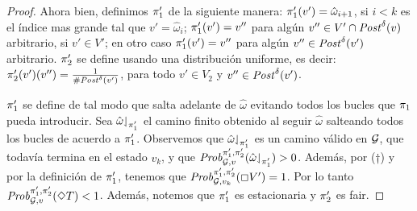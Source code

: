 \begin{proof}
  Ahora bien, definimos $\pi_{1}'$ de la siguiente manera:
  $\pi_{1}'(v') = \hat{\omega}_{i+1}$, si $i < k$ es el índice mas grande tal que $v' = \hat{\omega}_{i}$;
  $\pi_{1}'(v') = v''$ para algún $v'' \in
  V'\cap\mathit{Post}^\delta(v)$ arbitrario, si $v' \in V'$;
  en otro caso $\pi_{1}'(v') = v''$ para algún
  $v'' \in \mathit{Post}^\delta(v')$ arbitrario.
  $\pi_{2}'$ se define usando una distribución uniforme, es decir:
  $\pi_{2}'(v')(v'') = \frac{1}{\# \mathit{Post}^\delta(v')}$, para todo $v'
  \in V_2$ y $v'' \in \mathit{Post}^\delta(v')$.
  
  $\pi_{1}'$ se define de tal modo que salta adelante de $\hat{\omega}$
  evitando todos los bucles que $\pi_{1}$ pueda introducir.  Sea
  $\hat{\omega}{\downharpoonleft}_{\pi_{1}'}$ el camino finito obtenido al seguir $\hat{\omega}$ salteando todos los bucles de acuerdo a $\pi_{1}'$.
  Observemos que $\hat{\omega}{\downharpoonleft}_{\pi_{1}'}$ es un camino válido en $\mathcal{G}$, que todavía termina en el estado $v_k$, y que
  $\mathit{Prob}^{\pi_{1}',\pi_{2}'}_{\mathcal{G},v}({\hat{\omega}{\downharpoonleft}_{\pi_{1}'}})>0$.
  Además, por ($\dag$) y por la definición de $\pi_{1}'$, tenemos que $\mathit{Prob}^{\pi_{1}',\pi_{2}'}_{\mathcal{G}, v_k}(\Box V') = 1$.
  Por lo tanto $\mathit{Prob}^{\pi_{1}',\pi_{2}'}_{\mathcal{G}, v}(\Diamond T) < 1$.
  Además, notemos que $\pi_{1}'$ es estacionaria y $\pi_{2}'$
  es fair.
\qedhere
\end{proof}


